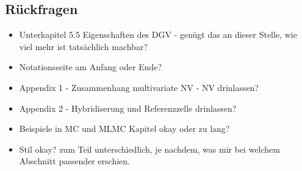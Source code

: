 \subsection{Rückfragen}
\begin{itemize}
	\item Unterkapitel 5.5 Eigenschaften des DGV - genügt das an dieser Stelle, wie viel mehr ist tatsächlich machbar?
	\item Notationsseite am Anfang oder Ende?
	\item Appendix 1 - Zusammenhang multivariate NV - NV drinlassen?
	\item Appendix 2 - Hybridiserung und Referenzzelle drinlassen?
	\item Beispiele in MC und MLMC Kapitel okay oder zu lang?
	\item Stil okay? zum Teil unterschiedlich, je nachdem, was mir bei welchem Abschnitt passender erschien.
\end{itemize}